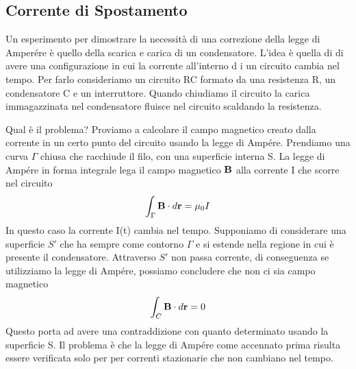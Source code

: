 \subsection{Corrente di Spostamento}

Un esperimento per dimostrare la necessit\`a di una correzione della legge di Amper\'ere \`e quello della scarica e carica di un condensatore. L'idea \`e quella di di avere una configurazione in cui la corrente all'interno d i un circuito cambia nel tempo. Per farlo consideriamo un circuito RC formato da una resistenza R, un condensatore C e un interruttore. Quando chiudiamo il circuito la carica immagazzinata nel condensatore fluisce  nel circuito scaldando la resistenza.
\newline

Qual \`e il problema? Proviamo a calcolare il campo magnetico creato dalla corrente in un certo punto del circuito  usando la legge di Amp\'ere. Prendiamo una curva $\Gamma $ chiusa che racchiude il filo, con una superficie interna S. La legge di Amp\'ere in forma integrale lega il campo magnetico $\bold{B}$ alla corrente I che scorre nel circuito 
\begin{equation*}
	\int_{\Gamma} \bold{B} \cdot d \bold{r} = \mu_0 I
\end{equation*}
In questo caso la corrente I(t) cambia nel tempo.
Supponiamo di considerare una superficie $S'$ che ha sempre come contorno $\Gamma$ e si estende nella regione in cui \`e presente il condensatore. Attraverso $S'$ non passa corrente, di conseguenza se utilizziamo la legge di Amp\'ere, possiamo concludere che non ci sia campo magnetico
\begin{equation*}
	\int_{C} \bold{B} \cdot d\bold{r} = 0 
\end{equation*}
Questo porta ad avere una contraddizione con quanto determinato usando la superficie S. Il problema \`e che la legge di Amp\'ere come accennato prima risulta essere verificata solo per per correnti stazionarie che non cambiano nel tempo.
\newline

